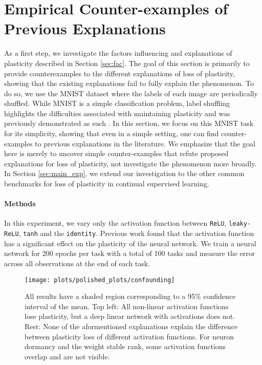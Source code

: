 \documentclass{article}
\begin{document}
\section{Empirical Counter-examples of Previous Explanations}
\vspace{-2mm}
\label{sec:counter}

As a first step, we investigate the factors influencing and explanations of plasticity described in Section \ref{sec:fac}.
The goal of this section is primarily to provide counterexamples to the different explanations of loss of plasticity, showing that the existing explanations fail to fully explain the phenomenon.
To do so, we use the MNIST dataset \citep{lecun10_mnist} where the labels of each image are periodically shuffled.
While MNIST is a simple classification problem, label shuffling highlights the difficulties associated with maintaining plasticity and was previously demonstrated as such \citep{lyle23_under,kumar23_maint_plast_regen_regul}.
In this section, we focus on this MNIST task for its simplicity, showing that even in a simple setting, one can find counter-examples to previous explanations in the literature.
We emphasize that the goal here is merely to uncover simple counter-examples that refute  proposed explanations for loss of plasticity,
not investigate the phenomenon more broadly.
In Section \ref{sec:main_exp}, we extend our investigation to the other common benchmarks for loss of plasticity in continual supervised learning.

\paragraph{Methods}
In this experiment, we vary only the activation function between \texttt{ReLU}, \texttt{leaky-ReLU}, \texttt{tanh} and the \texttt{identity}.
Previous work found that the activation function has a significant effect on the plasticity of the neural network.
We train a neural network for 200 epochs per task with a total of 100 tasks and measure the error across all observations at the end of each task.

\begin{figure}[h!]
  \centering
  \texttt{[image: plots/polished\_plots/confounding]}
  \caption{All results have a shaded region corresponding to a 95\% confidence interval of the mean. Top left: All non-linear activation functions lose plasticity, but a deep linear network with  activations does not. Rest: None of the aformentioned explanations explain the difference between plasticity loss of different activation functions. For neuron dormancy and the weight stable rank, some activation functions overlap and are not visible.
  }
  \label{fig:confounding}
\end{figure}
\end{document}
